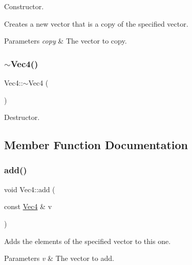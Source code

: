 Constructor.

Creates a new vector that is a copy of the specified vector.


\begin{DoxyParams}{Parameters}
{\em copy} & The vector to copy. \\
\hline
\end{DoxyParams}
\mbox{\label{classVec4_a3c8428ad7cfa4fe9e82ea571ab0ad119}} 
\subsubsection{\texorpdfstring{$\sim$\+Vec4()}{~Vec4()}\hspace{0.1cm}{\footnotesize\ttfamily [2/2]}}
{\footnotesize\ttfamily Vec4\+::$\sim$\+Vec4 (\begin{DoxyParamCaption}{ }\end{DoxyParamCaption})}

Destructor. 

\subsection{Member Function Documentation}
\mbox{\label{classVec4_a70178c94654489167656a8fe9452f14b}} 
\subsubsection{\texorpdfstring{add()}{add()}\hspace{0.1cm}{\footnotesize\ttfamily [1/4]}}
{\footnotesize\ttfamily void Vec4\+::add (\begin{DoxyParamCaption}\item[{const \hyperlink{classVec4}{Vec4} \&}]{v }\end{DoxyParamCaption})}

Adds the elements of the specified vector to this one.


\begin{DoxyParams}{Parameters}
{\em v} & The vector to add. \\
\hline
\end{DoxyParams}
\mbox{\label{classVec4_a70178c94654489167656a8fe9452f14b}} 
